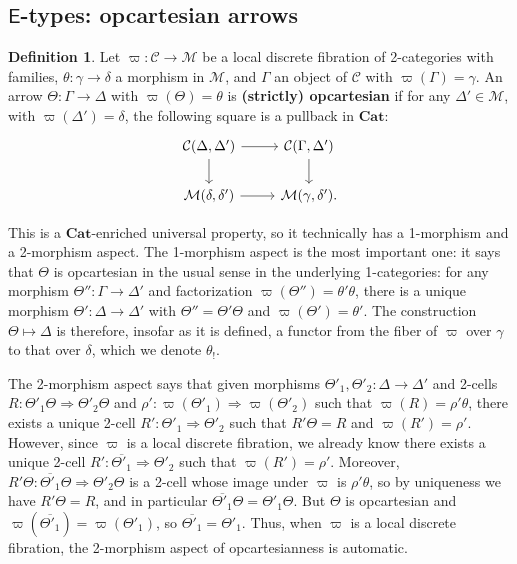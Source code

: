 \documentclass[10pt]{article}
\theoremstyle{definition}
\newtheorem{definition}{Definition}
\newcommand\Esym{\ensuremath{\mathsf{E}}}
\newcommand\Cat{\mathbf{Cat}}
\newcommand\M{\mathcal{M}}
\newcommand\C{\mathcal{C}}
\newcommand\vp{\varpi}
\begin{document}
\subsection{$\Esym$-types: opcartesian arrows}
\label{sec:opcartesian-arrows}

\begin{definition}
  Let $\vp:\C\to\M$ be a local discrete fibration of 2-categories with families, $\theta : \gamma\to\delta$ a morphism in $\M$, and $\Gamma$ an object of $\C$ with $\vp( \Gamma) = \gamma$.
  An arrow $\Theta : \Gamma\to \Delta$ with $\vp(\Theta) = \theta$ is \textbf{(strictly) opcartesian} if for any $\Delta'\in\M$, with $\vp(\Delta') = \delta$, the following square is a pullback in $\Cat$:
  \[
  \begin{tikzcd}
    \C(\Delta,\Delta') \ar[d] \ar[r] & \C(\Gamma,\Delta') \ar[d] \\
    \M(\delta,\delta') \ar[r] & \M(\gamma,\delta').
  \end{tikzcd}\]
\end{definition}

This is a $\Cat$-enriched universal property, so it technically has a 1-morphism and a 2-morphism aspect.
The 1-morphism aspect is the most important one: it says that $\Theta$ is opcartesian in the usual sense in the underlying 1-categories: for any morphism $\Theta'' : \Gamma\to\Delta'$ and factorization $\vp(\Theta'') = \theta' \theta$, there is a unique morphism $\Theta' : \Delta\to\Delta'$ with $\Theta'' = \Theta'\Theta$ and $\vp(\Theta') = \theta'$.
The construction $\Theta\mapsto\Delta$ is therefore, insofar as it is defined, a functor from the fiber of $\vp$ over $\gamma$ to that over $\delta$, which we denote $\theta_!$.

The 2-morphism aspect says that given morphisms $\Theta'_1,\Theta'_2 : \Delta\to\Delta'$ and 2-cells $R:\Theta'_1\Theta \Rightarrow \Theta'_2\Theta$ and $\rho' : \vp(\Theta'_1)\Rightarrow \vp(\Theta'_2)$ such that $\vp(R) = \rho' \theta$, there exists a unique 2-cell $R' : \Theta'_1\Rightarrow \Theta'_2$ such that $R' \Theta = R$ and $\vp(R') = \rho'$.
However, since $\vp$ is a local discrete fibration, we already know there exists a unique 2-cell $R' : \overline{\Theta'_1}\Rightarrow \Theta'_2$ such that $\vp(R') = \rho'$.
Moreover, $R'\Theta: \overline{\Theta'_1}\Theta \Rightarrow \Theta'_2\Theta$ is a 2-cell whose image under $\vp$ is $\rho'\theta$, so by uniqueness we have $R'\Theta = R$, and in particular $\overline{\Theta'_1}\Theta = \Theta'_1\Theta$.
But $\Theta$ is opcartesian and $\vp(\overline{\Theta'_1}) = \vp(\Theta'_1)$, so $\overline{\Theta'_1} = \Theta'_1$.
Thus, when $\vp$ is a local discrete fibration, the 2-morphism aspect of opcartesianness is automatic.
\end{document}
